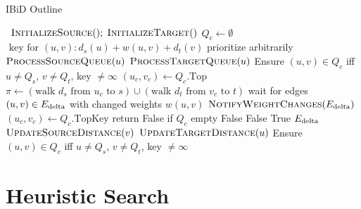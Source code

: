 \begin{algorithm}[t]
   \caption{IBiD Outline}
   \label{alg:ibid}
   \begin{algorithmic}[1]
       {\,}
         \State $\mbox{\sc InitializeSource}(); \; \mbox{\sc InitializeTarget}()$
         \State $Q_c \gets \emptyset$
            \Comment $\mbox{ key for } (u,v): d_s(u) + w(u,v) + d_t(v)$
         \Loop
                     \Comment prioritize arbitrarily
                  \State $\mbox{\sc ProcessSourceQueue}(u)$
               \Else
                  \State $\mbox{\sc ProcessTargetQueue}(u)$
               \EndIf
               \State Ensure $(u,v) \in Q_c$ iff
                  $u \neq Q_s$, $v \neq Q_t$, key $\neq \infty$
            \EndWhile
            \State $(u_c,v_c) \gets Q_c.\mbox{Top}$
            \State $\pi \gets
               ( \mbox{walk } d_s \mbox{ from } u_c \mbox{ to } s )
               \cup
               ( \mbox{walk } d_t \mbox{ from } v_c \mbox{ to } t )$
            \State wait for edges $(u,v) \in E_{\mbox{\scriptsize delta}}$ with changed weights $w(u,v)$
            \State $\mbox{\sc NotifyWeightChanges}(E_{\mbox{\scriptsize delta}})$
         \EndLoop
      \EndProcedure
       {\,}
         \State $(u_c,v_c) \gets Q_c.\mbox{TopKey}$
            \Comment return False if $Q_c$ empty
            \State \Return False
         \EndIf
            \State \Return False
         \EndIf
         \State \Return True
      \EndFunction
       {$E_{\mbox{\scriptsize delta}}$}
            \State $\mbox{\sc UpdateSourceDistance}(v)$
            \State $\mbox{\sc UpdateTargetDistance}(u)$
         \EndFor
         \State Ensure $(u,v) \in Q_c$ iff
            $u \neq Q_s$, $v \neq Q_t$, key $\neq \infty$
      \EndProcedure
   \end{algorithmic}
\end{algorithm}



\section{Heuristic Search}
\label{sec:ibid:heuristic}

